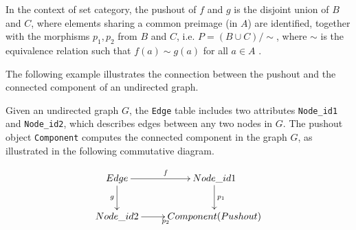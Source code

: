  In the context of set category, the pushout of $f$ and $g$ is the disjoint union of $B$ and $C$, where elements sharing a common preimage (in $A$) are identified, together with the morphisms $p_1, p_2$ from $B$ and $C$, i.e.  $P=(B\cup C)/ \sim $, where $\sim$ is the equivalence relation
such that $f(a) \sim g(a)$ for all $a \in A$ .





The following example illustrates the connection between the pushout and the connected component of an undirected graph.

\begin{example} Given an undirected graph $G$, the \texttt{Edge} table includes two attributes \texttt{Node\_id1} and \texttt{Node\_id2}, which describes edges between any two nodes in $G$.   The pushout object \texttt{Component} computes the connected component in the graph $G$, as illustrated in the following commutative diagram.


\[\xymatrix{Edge \ar[r]^{f} \ar[d]_{g} & Node\_id1 \ar[d]^{p_1} \\Node\_id2 \ar[r]_{p_2} & Component (Pushout) }\]\end{example}

